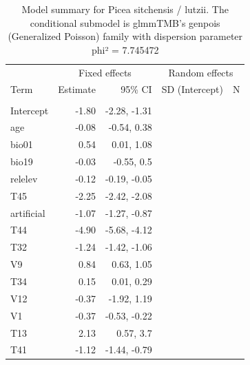 \documentclass[
]{article}
\begin{document}
\begin{longtable}[t]{lrrrr}
\caption{\label{tab:summaries-tables}\label{tab:Ps}Model summary for Picea sitchensis / lutzii. The conditional submodel is glmmTMB's genpois (Generalized Poisson) family with dispersion parameter phi² = 7.745472}\\
\toprule
\multicolumn{1}{c}{ } & \multicolumn{2}{c}{Fixed effects} & \multicolumn{2}{c}{Random effects} \\
\cmidrule(l{3pt}r{3pt}){2-3} \cmidrule(l{3pt}r{3pt}){4-5}
Term & Estimate & 95\% CI & SD (Intercept) & N\\
\midrule
\addlinespace[0.3em]
\multicolumn{5}{l}{\textbf{Conditional model}}\\
\hspace{1em}Intercept & -1.80 & -2.28, -1.31 &  & \\
\hspace{1em}age & -0.08 & -0.54, 0.38 &  & \\
\hspace{1em}bio01 & 0.54 & 0.01, 1.08 &  & \\
\hspace{1em}bio19 & -0.03 & -0.55, 0.5 &  & \\
\hspace{1em}relelev & -0.12 & -0.19, -0.05 &  & \\
\hspace{1em}T45 & -2.25 & -2.42, -2.08 &  & \\
\hspace{1em}artificial & -1.07 & -1.27, -0.87 &  & \\
\hspace{1em}T44 & -4.90 & -5.68, -4.12 &  & \\
\hspace{1em}T32 & -1.24 & -1.42, -1.06 &  & \\
\hspace{1em}V9 & 0.84 & 0.63, 1.05 &  & \\
\hspace{1em}T34 & 0.15 & 0.01, 0.29 &  & \\
\hspace{1em}V12 & -0.37 & -1.92, 1.19 &  & \\
\hspace{1em}V1 & -0.37 & -0.53, -0.22 &  & \\
\hspace{1em}T13 & 2.13 & 0.57, 3.7 &  & \\
\hspace{1em}T41 & -1.12 & -1.44, -0.79 &  & \\

\end{longtable}
\end{document}
